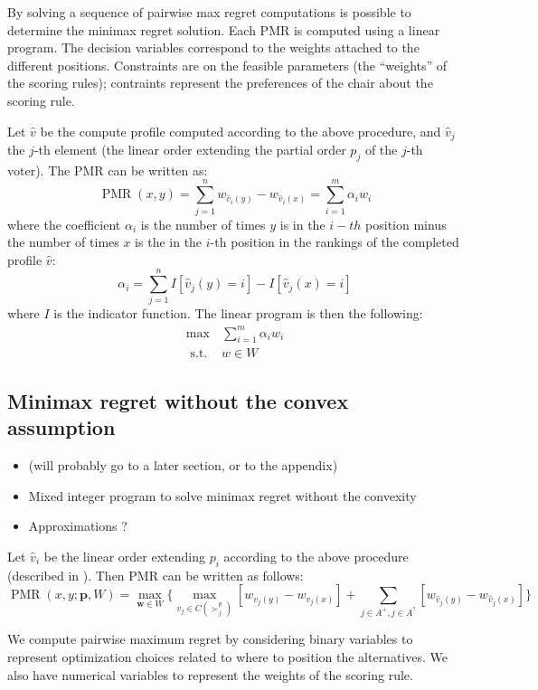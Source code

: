 \documentclass[12pt]{article}
\newcommand{\pprofile}{\textbf{p}}%
\newcommand{\w}{\textbf{w}}%
\DeclareMathOperator{\PMR}{PMR}
\begin{document}
By solving a sequence of pairwise max regret computations is possible to determine the minimax regret solution.
Each PMR is computed using a linear program.
The decision variables correspond to the weights attached to the different positions.
Constraints are on the feasible parameters (the ``weights'' of the scoring rules); contraints represent the preferences of the chair about the scoring rule.

Let $\hat{v}$ be the compute profile computed according to the above procedure, and  $\hat{v}_j$ the $j$-th element (the linear order extending the partial order $p_j$ of the $j$-th voter).
The PMR can be written as:
\[ \PMR(x,y) = \sum_{j=1}^n w_{\hat{v}_i(y)} - w_{\hat{v}_i(x)} 
= \sum_{i=1}^m \alpha_i w_i \]
where the coefficient $\alpha_i$ is the number of times $y$ is in the $i-th$ position minus the number of times $x$ is the in the $i$-th position in the rankings of the completed profile $\hat{v}$:
\[ \alpha_{i} = \sum_{j=1}^{n}  I[\hat{v}_{j}(y)=i] - I[\hat{v}_{j}(x)=i]\]
where $I$ is the indicator function.
The linear program is then the following:
\begin{align}
\max & \sum_{i=1}^m \alpha_i w_{i}\\
\text{ s.t. } & w \in W
\end{align}

\subsection{Minimax regret without the convex assumption}

\begin{itemize}	
	\item (will probably go to a later section, or to the appendix)
	\item Mixed integer program to solve minimax regret without the convexity
 	\item Approximations ?
\end{itemize}

Let $\hat{v}_i$ be the linear order extending $p_i$ according to the above procedure (described in \cite{Lu2011}).
Then PMR can be written as follows:
\[ \PMR(x,y; \pprofile, W) = \max_{\w \in W} \Big \{ \max_{v_j \in C(\succ_j^p)} [w_{v_j(y)} - w_{v_j(x)}]  + \sum_{j \in A^+, j \in A^?} [w_{\hat{v}_j(y)} - w_{\hat{v}_j(x)}] \Big \} \]


We compute pairwise maximum regret by considering binary variables to represent optimization choices related to where to position the alternatives.
We also have numerical variables to represent the weights of the scoring rule.
\end{document}
